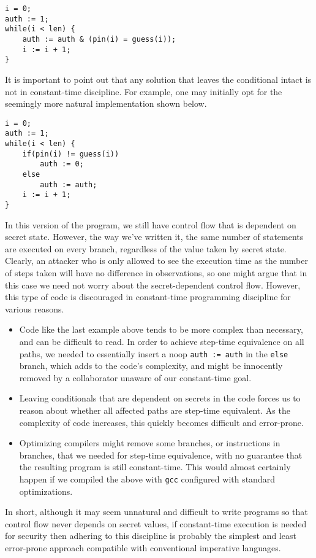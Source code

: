 \documentclass[11pt,twoside]{scrartcl}
\begin{document}
\lstset{language=C}
\begin{lstlisting}
i = 0;
auth := 1;
while(i < len) {
	auth := auth & (pin(i) = guess(i));
	i := i + 1;
}
\end{lstlisting}

It is important to point out that any solution that leaves the conditional intact is not in constant-time discipline. For example, one may initially opt for the seemingly more natural implementation shown below.

\lstset{language=C}
\begin{lstlisting}
i = 0;
auth := 1;
while(i < len) {
	if(pin(i) != guess(i)) 
		auth := 0;
	else
		auth := auth;
	i := i + 1;
}
\end{lstlisting}

In this version of the program, we still have control flow that is dependent on secret state. However, the way we've written it, the same number of statements are executed on every branch, regardless of the value taken by secret state. Clearly, an attacker who is only allowed to see the execution time as the number of steps taken will have no difference in observations, so one might argue that in this case we need not worry about the secret-dependent control flow. However, this type of code is discouraged in constant-time programming discipline for various reasons.
\begin{itemize}
\item Code like the last example above tends to be more complex than necessary, and can be difficult to read. In order to achieve step-time equivalence on all paths, we needed to essentially insert a noop \texttt{auth := auth} in the \texttt{else} branch, which adds to the code's complexity, and might be innocently removed by a collaborator unaware of our constant-time goal.

\item Leaving conditionals that are dependent on secrets in the code forces us to reason about whether all affected paths are step-time equivalent. As the complexity of code increases, this quickly becomes difficult and error-prone.

\item Optimizing compilers might remove some branches, or instructions in branches, that we needed for step-time equivalence, with no guarantee that the resulting program is still constant-time. This would almost certainly happen if we compiled the above with \texttt{gcc} configured with standard optimizations.
\end{itemize}
In short, although it may seem unnatural and difficult to write programs so that control flow never depends on secret values, if constant-time execution is needed for security then adhering to this discipline is probably the simplest and least error-prone approach compatible with conventional imperative languages.



\end{document}
